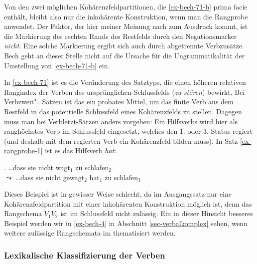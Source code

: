 Von den zwei möglichen Kohärenzfeldpartitionen, die \ref{ex-bech-71-b} prima facie enthält, bleibt also nur die inkohärente Konstruktion, wenn man die Rangprobe anwendet. Der Faktor, der hier meiner Meinung nach zum Ausdruck kommt, ist die Markierung des rechten Rands des Restfelds durch den Negationsmarker {\it nicht}. Eine solche Markierung ergibt sich auch durch abgetrennte Verbzusätze. Bech geht an dieser Stelle nicht auf die Ursache für die Ungrammatikalität der Umstellung von \ref{ex-bech-71-b} ein.

In \ref{ex-bech-71} ist es die Veränderung des Satztyps, die einen höheren relativen Rangindex der Verben des ursprünglichen Schlussfelds ({\it zu stören}) bewirkt. Bei Verbzweit"=Sätzen ist das ein probates Mittel, um das finite Verb aus dem Restfeld in das potentielle Schlussfeld eines Kohärenzfelds zu stellen. Dagegen muss man bei Verbletzt-Sätzen anders vorgehen: Ein Hilfsverbs wird hier als ranghöchstes Verb im Schlussfeld eingesetzt, welches den 1. oder 3. Status regiert (und deshalb mit dem regierten Verb ein Kohärenzfeld bilden muss). In Satz \ref{ex-rangprobe-1} ist es das Hilfsverb {\it hat}:

\ex. \label{ex-rangprobe-1}\ldots dass sie nicht wagt$_1$ zu schlafen$_2$ \\
$\leadsto$ \ldots dass sie nicht gewagt$_2$ hat$_1$ zu schlafen$_3$

Dieses Beispiel ist in gewisser Weise schlecht, da im Ausgangssatz nur eine Kohärenzfeldpartition mit einer inkohärenten Konstruktion möglich ist, denn das Rangschema $V_1 V_2$ ist im Schlussfeld nicht zulässig. Ein in dieser Hinsicht besseres Beispiel werden wir in \ref{ex-bech-4} in Abschnitt \ref{sec-verbalkomplex} sehen, wenn weitere zulässige Rangschemata im  thematisiert werden.



\subsubsection*{Lexikalische Klassifizierung der Verben}

